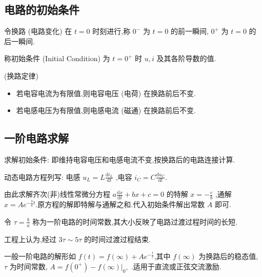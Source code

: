 
\usepackage{../../lectures_preamble}


    \subsection{电路的初始条件}
    令换路 (电路变化) 在 $t=0$ 时刻进行,称 $0^{-}$ 为 $t=0$ 的前一瞬间, $0^{+}$ 为 $t=0$ 的后一瞬间.

    称初始条件 (Initial Condition) 为 $t=0^{+}$ 时 $u,i$ 及其各阶导数的值.

    \begin{theorem}
        (换路定律) 
        \begin{itemize}
            \item 若电容电流为有限值,则电容电压 (电荷) 在换路前后不变.
            \item 若电感电压为有限值,则电感电流 (磁通) 在换路前后不变.
        \end{itemize}
    \end{theorem}
    \subsection{一阶电路求解}
    求解初始条件: 即维持电容电压和电感电流不变,按换路后的电路连接计算.

    动态电路方程列写: 电感 $u_{L}=L \frac{\mathrm{d}i_{L}}{\mathrm{d}t}$ ,电容 $i_{C}=C \frac{\mathrm{d}u_{C}}{\mathrm{d}t}$.

    由此求解齐次(非)线性常微分方程 $a \frac{\mathrm{d}x}{\mathrm{d}t}+bx+c=0$ 的特解 $x=-\frac{c}{b}$ ,通解 $x=Ae^{-\frac{b}{a}t}$.原方程的解即特解与通解之和.代入初始条件解出常数 $A$ 即可.

    令 $\tau=\frac{b}{a}$ 称为一阶电路的时间常数,其大小反映了电路过渡过程时间的长短.

    工程上认为,经过 $3\tau\sim{}5\tau$ 的时间过渡过程结束.

    一般一阶电路的解形如 $f(t)=f(\infty)+Ae^{-\frac{t}{\tau}}$,其中 $f(\infty)$ 为换路后的稳态值, $\tau$ 为时间常数, $A=f(0^{+})-f(\infty)\big|_{0^{+}}$ .适用于直流或正弦交流激励.

